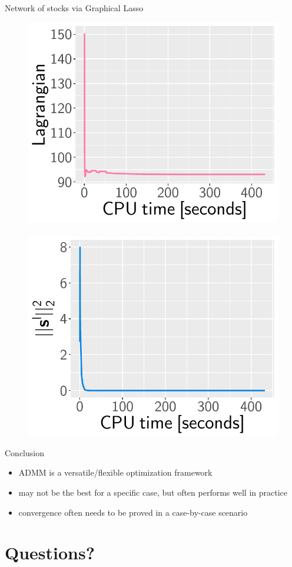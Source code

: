 \documentclass[aspectratio=169]{beamer}
\begin{document}
                \begin{frame}{Network of stocks via Graphical Lasso}
                  \begin{figure}[!htb]
                    \centering
                    \includegraphics[scale=0.5]{images/augmented-lagrangian.pdf}
                    ~
                    \includegraphics[scale=0.5]{images/primal-residual.pdf}
                  \end{figure}
                \end{frame}

                \begin{frame}{Conclusion}
                  \begin{itemize}
                    \item ADMM is a versatile/flexible optimization framework
                    \item may not be the best for a specific case, but often performs well in practice
                    \item convergence often needs to be proved in a case-by-case scenario
                  \end{itemize}
                \end{frame}

                \section*{Questions?}
\end{document}
